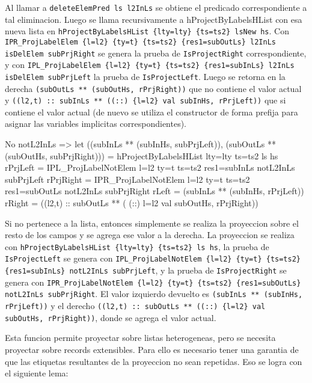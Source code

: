 Al llamar a \texttt{deleteElemPred ls l2InLs} se obtiene el predicado correspondiente a tal eliminacion. Luego se llama recursivamente a hProjectByLabelsHList con esa nueva lista en \texttt{hProjectByLabelsHList \{lty=lty\} \{ts=ts2\} lsNew hs}. Con \texttt{IPR\_ProjLabelElem \{l=l2\} \{ty=t\} \{ts=ts2\} \{res1=subOutLs\} l2InLs isDelElem subPrjRight} se genera la prueba de \texttt{IsProjectRight} correspondiente, y con \texttt{IPL\_ProjLabelElem \{l=l2\} \{ty=t\} \{ts=ts2\} \{res1=subInLs\} l2InLs isDelElem subPrjLeft} la prueba de \texttt{IsProjectLeft}. Luego se retorna en la derecha \texttt{(subOutLs ** (subOutHs, rPrjRight))} que no contiene el valor actual y \texttt{((l2,t) :: subInLs ** ((::) \{l=l2\} val subInHs, rPrjLeft))} que si contiene el valor actual (de nuevo se utiliza el constructor de forma prefija para asignar las variables implicitas correspondientes).

\begin{code}
No notL2InLs =>
  let
    ((subInLs ** (subInHs, subPrjLeft)), 
      (subOutLs ** (subOutHs, subPrjRight))) =
      hProjectByLabelsHList {lty=lty} {ts=ts2} ls hs
    rPrjLeft = IPL_ProjLabelNotElem {l=l2} {ty=t} {ts=ts2} 
      {res1=subInLs} notL2InLs subPrjLeft
    rPrjRight = IPR_ProjLabelNotElem {l=l2} {ty=t} {ts=ts2} 
      {res1=subOutLs} notL2InLs subPrjRight
    rLeft = (subInLs ** (subInHs, rPrjLeft))
    rRight = ((l2,t) :: subOutLs ** (
      (::) {l=l2} val subOutHs, rPrjRight))
\end{code}

Si no pertenece a la lista, entonces simplemente se realiza la proyeccion sobre el resto de los campos y se agrega ese valor a la derecha. La proyeccion se realiza con \texttt{hProjectByLabelsHList \{lty=lty\} \{ts=ts2\} ls hs}, la prueba de \texttt{IsProjectLeft} se genera con \texttt{IPL\_ProjLabelNotElem \{l=l2\} \{ty=t\} \{ts=ts2\} \{res1=subInLs\} notL2InLs subPrjLeft}, y la prueba de \texttt{IsProjectRight} se genera con \texttt{IPR\_ProjLabelNotElem \{l=l2\} \{ty=t\} \{ts=ts2\} \{res1=subOutLs\} notL2InLs subPrjRight}. El valor izquierdo devuelto es \texttt{(subInLs ** (subInHs, rPrjLeft))} y el derecho \texttt{((l2,t) :: subOutLs ** ((::) \{l=l2\} val subOutHs, rPrjRight))}, donde se agrega el valor actual.

Esta funcion permite proyectar sobre listas heterogeneas, pero se necesita proyectar sobre records extensibles.
Para ello es necesario tener una garantia de que las etiquetas resultantes de la proyeccion no sean repetidas. Eso se logra con el siguiente lema:

